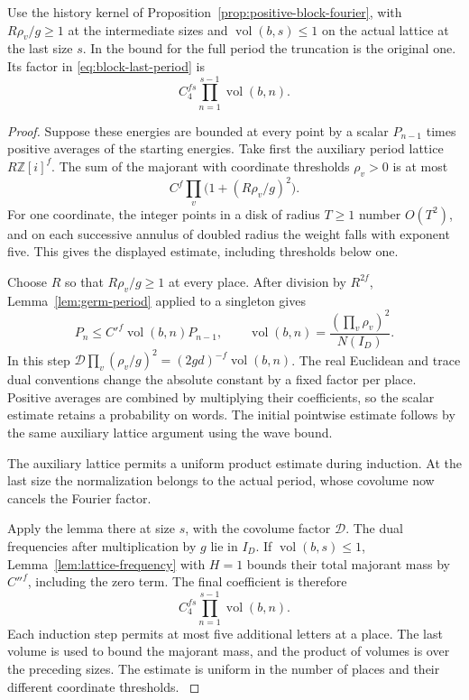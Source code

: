 \begin{proposition}\label{prop:auxiliary-period-comparison}
Use the history kernel of Proposition~\ref{prop:positive-block-fourier},
with \(R\rho_v/g\ge1\) at the intermediate sizes and
\(\operatorname{vol}(b,s)\le1\) on the actual lattice at the
last size \(s\). In the bound for the full period the truncation is the original one. Its factor in \eqref{eq:block-last-period} is 
\[
 C_4^{fs}\prod_{n=1}^{s-1}\operatorname{vol}(b,n).
\]

\end{proposition}

\begin{proof}

Suppose these energies are bounded at every point by a
scalar \(P_{n-1}\) times positive averages of the starting
energies. Take first the auxiliary period lattice
\(R\mathbb Z[i]^f\). The sum of the majorant with coordinate
thresholds \(\rho_v>0\) is at most
\[
 C^f\prod_v\bigl(1+(R\rho_v/g)^2\bigr).
\]
For one coordinate, the integer points in a disk of radius
\(T\ge1\) number \(O(T^2)\), and on each successive annulus
of doubled radius the weight falls with exponent five.
This gives the displayed estimate, including thresholds
below one.

Choose \(R\) so that \(R\rho_v/g\ge1\) at every
place. After division by \(R^{2f}\), Lemma~\ref{lem:germ-period}
applied to a singleton gives
\[
 P_n\le C'^f\operatorname{vol}(b,n)P_{n-1},\qquad
 \operatorname{vol}(b,n)=
 \frac{(\prod_v\rho_v)^2}{N(I_D)} .
\]
In this step
\(\mathcal D\prod_v(\rho_v/g)^2
  =(2gd)^{-f}\operatorname{vol}(b,n)\).
The real Euclidean and trace dual conventions change the
absolute constant by a fixed factor per place. Positive
averages are combined by multiplying their coefficients, so
the scalar estimate retains a probability on words. The
initial pointwise estimate follows by the same auxiliary
lattice argument using the wave bound.


The auxiliary lattice permits a uniform product estimate during induction. At the last size the normalization belongs to the actual period, whose covolume now cancels the Fourier factor.


Apply the lemma there at size \(s\), with the covolume factor \(\mathcal D\). The dual
frequencies after multiplication by \(g\) lie in \(I_D\).
If \(\operatorname{vol}(b,s)\le1\), Lemma~\ref{lem:lattice-frequency}
with \(H=1\) bounds their total majorant mass by \(C''^f\),
including the zero term. The final coefficient is therefore
\begin{equation}\label{eq:block-last-period}
 C_4^{fs}\prod_{n=1}^{s-1}\operatorname{vol}(b,n).
\end{equation}
Each induction step permits at most five additional letters
at a place. The last volume is used to bound the majorant
mass, and the product of volumes is over the preceding
sizes. The estimate is uniform in the number of places and
their different coordinate thresholds.
\label{cor:block-recursion-2}

\end{proof}

